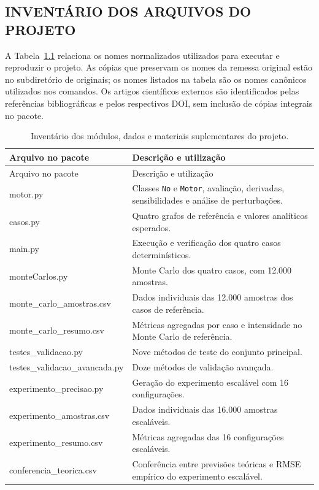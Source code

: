 \documentclass[12pt,openright,oneside,a4paper,brazil]{abntex2}
\newcommand{\arquivo}[1]{\textsf{\small #1}}
\begin{document}
\begin{apendicesenv}
\chapter{INVENTÁRIO DOS ARQUIVOS DO PROJETO}
A Tabela~\ref{tab:inventario} relaciona os nomes normalizados utilizados para executar e reproduzir o projeto. As cópias que preservam os nomes da remessa original estão no subdiretório de originais; os nomes listados na tabela são os nomes canônicos utilizados nos comandos. Os artigos científicos externos são identificados pelas referências bibliográficas e pelos respectivos DOI, sem inclusão de cópias integrais no pacote.
\begin{longtable}{p{}p{}}
\caption{Inventário dos módulos, dados e materiais suplementares do projeto.}\label{tab:inventario}\\
\toprule
Arquivo no pacote & Descrição e utilização\\
\midrule
\endfirsthead
\toprule
Arquivo no pacote & Descrição e utilização\\
\midrule
\endhead
\arquivo{motor.py} & Classes \texttt{No} e \texttt{Motor}, avaliação, derivadas, sensibilidades e análise de perturbações.\\
\arquivo{casos.py} & Quatro grafos de referência e valores analíticos esperados.\\
\arquivo{main.py} & Execução e verificação dos quatro casos determinísticos.\\
\arquivo{monteCarlos.py} & Monte Carlo dos quatro casos, com 12.000 amostras.\\
\arquivo{monte\_carlo\_amostras.csv} & Dados individuais das 12.000 amostras dos casos de referência.\\
\arquivo{monte\_carlo\_resumo.csv} & Métricas agregadas por caso e intensidade no Monte Carlo de referência.\\
\arquivo{testes\_validacao.py} & Nove métodos de teste do conjunto principal.\\
\arquivo{testes\_validacao\_avancada.py} & Doze métodos de validação avançada.\\
\arquivo{experimento\_precisao.py} & Geração do experimento escalável com 16 configurações.\\
\arquivo{experimento\_amostras.csv} & Dados individuais das 16.000 amostras escaláveis.\\
\arquivo{experimento\_resumo.csv} & Métricas agregadas das 16 configurações escaláveis.\\
\arquivo{conferencia\_teorica.csv} & Conferência entre previsões teóricas e RMSE empírico do experimento escalável.\\

\end{longtable}
\end{apendicesenv}
\end{document}
